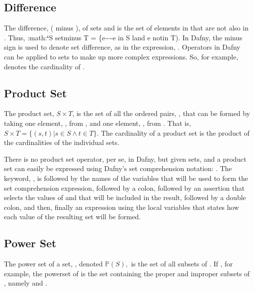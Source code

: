 \documentclass[letterpaper,10pt,english]{sphinxmanual}
\begin{document}
\subsection{Difference}
\label{\detokenize{07-set-theory:difference}}
The difference,  ( minus ), of sets  and  is the set
of elements in  that are not also in . Thus, :math:{\color{red}\bfseries{}{}`}S setminus
T = \{e\textasciitilde{}\textbar{}\textasciitilde{}e in S land e notin T). In Dafny, the minus sign is used
to denote set difference, as in the expression, . Operators in
Dafny can be applied to sets to make up more complex expressions. So,
for example,  denotes the cardinality of .


\subsection{Product Set}
\label{\detokenize{07-set-theory:product-set}}
The product set, \(S \times T\), is the set of all the ordered
pairs, , that can be formed by taking one element, , from
, and one element, , from . That is, \(S \times T = \{
(s, t) | s \in S \land t \in T \}\). The cardinality of a product set
is the product of the cardinalities of the individual sets.

There is no product set operator, per se, in Dafny, but given sets,
 and  a product set can easily be expressed using Dafny’s set
comprehension notation: . The
keyword, , is followed by the names of the variables that will be
used to form the set comprehension expression, followed by a colon,
followed by an assertion that selects the values of  and  that
will be included in the result, followed by a double colon, and then,
finally an expression using the local variables that states how each
value of the resulting set will be formed.


\subsection{Power Set}
\label{\detokenize{07-set-theory:power-set}}
The power set of a set, , denoted \({\mathbb P}(S),\) is the
set of all subsets of . If , for example, the powerset
of  is the set containing the proper and improper subsets of ,
namely  and .
\end{document}
